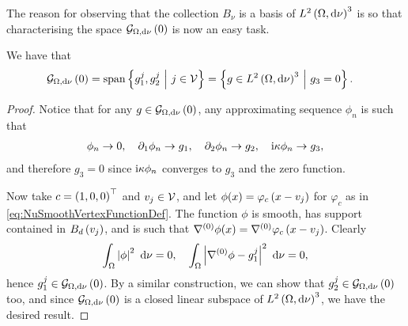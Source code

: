 The reason for observing that the collection $B_{\nu}$ is a basis of $L^{2}\left( \Omega,\mathrm{d}\nu \right)^3$ is so that characterising the space $\mathcal{G}_{ \Omega, \mathrm{d}\nu}\left( 0 \right)$ is now an easy task.
\begin{prop} \label{prop:NuGradZeroChar}
	We have that 
	\begin{align*}
		\mathcal{G}_{ \Omega, \mathrm{d}\nu}\left( 0 \right) &= \mathrm{span}\left\{ g_1^j, g_2^j \ \middle\vert \  j\in\mathcal{V}  \right\}
		= \left\{  g\in L^{2}\left( \Omega,\mathrm{d}\nu \right)^3 \ \middle\vert \  g_3 = 0 \right\}.
	\end{align*}
\end{prop}
\begin{proof}
	Notice that for any $g\in\mathcal{G}_{ \Omega, \mathrm{d}\nu}\left( 0 \right)$, any approximating sequence $\phi_n$ is such that
	\begin{align*}
		\phi_n \rightarrow 0, \quad \partial_1\phi_n \rightarrow g_1, 
		\quad \partial_2\phi_n\rightarrow g_2, \quad \mathrm{i}\kappa\phi_n \rightarrow g_3,
	\end{align*}
	and therefore $g_3 = 0$ since $\mathrm{i}\kappa\phi_n$ converges to $g_3$ and the zero function.
	
	Now take $c=\left( 1,0,0 \right)^\top$ and $v_j\in\mathcal{V}$, and let $\phi(x) = \varphi_c\left( x-v_j \right)$ for $\varphi_c$ as in \eqref{eq:NuSmoothVertexFunctionDef}.
	The function $\phi$ is smooth, has support contained in $B_d\left( v_j \right)$, and is such that $\nabla^{(0)}\phi(x) = \nabla^{(0)}\varphi_c\left( x-v_j \right)$.
	Clearly
	\begin{align*}
		\int_{\Omega}\left\lvert \phi \right\rvert^2 \ \mathrm{d}\nu = 0, \quad
		\int_{\Omega}\left\lvert \nabla^{(0)}\phi - g_1^j \right\rvert^2 \ \mathrm{d}\nu = 0,
	\end{align*}
	hence $g_1^j\in\mathcal{G}_{ \Omega, \mathrm{d}\nu}\left( 0 \right)$.
	By a similar construction, we can show that $g_2^j\in\mathcal{G}_{ \Omega, \mathrm{d}\nu}\left( 0 \right)$ too, and since $\mathcal{G}_{ \Omega, \mathrm{d}\nu}\left( 0 \right)$ is a closed linear subspace of $L^{2}\left( \Omega,\mathrm{d}\nu \right)^3$, we have the desired result.
\end{proof}

